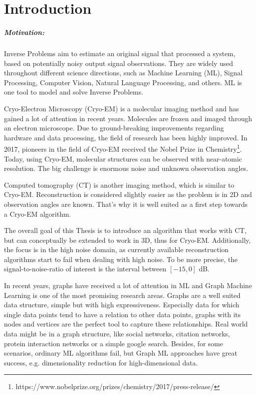 \chapter{Introduction}
\label{sec:introduction}

\paragraph{Motivation:}
Inverse Problems aim to estimate an original signal that processed a system, 
based on potentially noisy output signal observations.
They are widely used throughout different science directions, such as Machine Learning (ML),
Signal Processing, Computer Vision, Natural Language Processing, and others.
ML is one tool to model and solve Inverse Problems.

Cryo-Electron Microscopy (Cryo-EM) is a molecular imaging method and has gained a lot of attention in recent years. 
Molecules are frozen and imaged through an electron microscope.
Due to ground-breaking improvements regarding hardware and data processing, the field of research
has been highly improved. In 2017, pioneers in the field of Cryo-EM received the 
Nobel Prize in Chemistry\footnote{https://www.nobelprize.org/prizes/chemistry/2017/press-release/}.
Today, using Cryo-EM, molecular structures can be observed with near-atomic resolution.
The big challenge is enormous noise and unknown observation angles.

Computed tomography (CT) is another imaging method, which is similar to Cryo-EM. 
Reconstruction is considered slightly easier as the problem is in 2D and observation angles are known.
That's why it is well suited as a first step towards a Cryo-EM algorithm.

The overall goal of this Thesis is to introduce an algorithm that works with CT, but 
can conceptually be extended to work in 3D, thus for Cryo-EM. 
Additionally, the focus is in the high noise domain, as currently available reconstruction algorithms
start to fail when dealing with high noise. To be more precise, the signal-to-noise-ratio of interest is the interval 
 between $[-15, 0]$ dB.


In recent years, graphs have received a lot of attention in ML and Graph Machine Learning is one of the most promising research areas.
Graphs are a well suited data structure, simple but with high expressiveness. 
Especially data for which single data points tend to have a relation to other data points, graphs with its nodes and vertices are the perfect tool
to capture these relationships. 
Real world data might be in a graph structure, like social networks, citation networks,
protein interaction networks or a simple google search. 
Besides, for some scenarios, ordinary ML algorithms fail, but Graph ML approaches have great success, e.g. dimensionality reduction for high-dimensional data.



